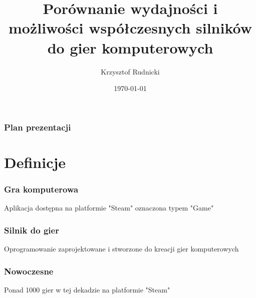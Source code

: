 \documentclass{beamer}
\title{\large Porównanie wydajności i możliwości współczesnych silników do gier komputerowych}
\author{Krzysztof Rudnicki}
\institute{
    \textbf{Promotor} \\
    dr inż. Michał Chwesiuk
}
\date{\scriptsize \today} %
\begin{document}
\begin{frame}
  \vspace{-0.5cm} %
  \maketitle
\end{frame}

\begin{frame}
\frametitle{Plan prezentacji}
\tableofcontents
\end{frame}

\section{Definicje}
\begin{frame}
  \frametitle{Gra komputerowa}
  \large Aplikacja dostępna na platformie "Steam" oznaczona typem "Game"
\end{frame}
\begin{frame}
\frametitle{Silnik do gier}
\large Oprogramowanie zaprojektowane i stworzone do kreacji gier komputerowych
\end{frame}

\begin{frame}
  \frametitle{Nowoczesne}
  \large Ponad 1000 gier w tej dekadzie na platformie "Steam"
\end{frame}


{
\begin{frame}
\end{frame}
}
\end{document}
